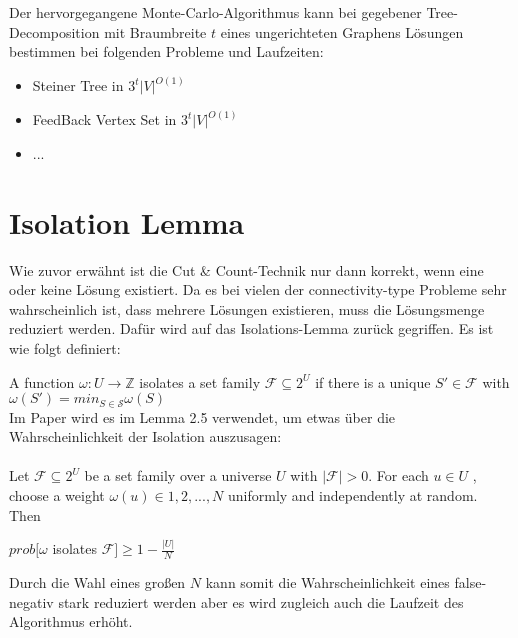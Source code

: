 Der hervorgegangene Monte-Carlo-Algorithmus kann bei gegebener Tree-Decomposition mit Braumbreite $t$ eines ungerichteten Graphens Lösungen bestimmen bei folgenden Probleme und Laufzeiten:
\begin{itemize}
\item Steiner Tree in $3^t |V|^{O(1)}$
\item FeedBack Vertex Set in $3^t|V|^{O(1)}$
\item ...
\end{itemize}

\section{Isolation Lemma}
\label{sec:cc_iso}

Wie zuvor erwähnt ist die Cut \& Count-Technik nur dann korrekt, wenn eine oder keine Lösung existiert. Da es bei vielen der connectivity-type Probleme sehr  wahrscheinlich ist, dass mehrere Lösungen existieren, muss die Lösungsmenge reduziert werden. Dafür wird auf das Isolations-Lemma zurück gegriffen. Es ist wie folgt definiert:

A function $\omega : U \rightarrow \mathbb{Z}$ isolates a set family $\mathcal{F} \subseteq 2^U$ if there is a unique $S' \in \mathcal{F}$ with $\omega (S')=min_{S \in \mathcal{S}} \omega(S)$\\

Im Paper wird es im Lemma 2.5 verwendet, um etwas über die Wahrscheinlichkeit der Isolation auszusagen:\\
\\Let $\mathcal{F} \subseteq 2^U$ be a set family over a universe $U$ with $|\mathcal{F}| > 0$. For each $u \in U$ ,
choose a weight $\omega(u) \in {1, 2, . . . , N }$ uniformly and independently at random. Then
\begin{center}
$prob[\omega$ isolates $\mathcal{F}]\geq 1 - \frac{|U|}{N}$
\end{center}

Durch die Wahl eines großen $N$ kann somit die Wahrscheinlichkeit eines false-negativ stark reduziert werden aber es wird zugleich auch die Laufzeit des Algorithmus erhöht.